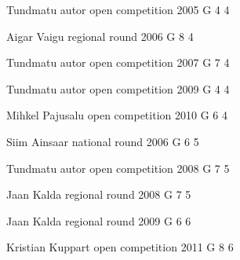 \documentclass[11pt]{article}
\begin{document}
\ylDisplay{} %
{Tundmatu autor} %
{open competition} %
{2005} %
{G 4} %
{4} %
{

\ifEngStatement
\fi
}

\ylDisplay{} %
{Aigar Vaigu} %
{regional round} %
{2006} %
{G 8} %
{4} %
{

\ifEngStatement
\fi
}

\ylDisplay{} %
{Tundmatu autor} %
{open competition} %
{2007} %
{G 7} %
{4} %
{

\ifEngStatement
\fi
}

\ylDisplay{} %
{Tundmatu autor} %
{open competition} %
{2009} %
{G 4} %
{4} %
{

\ifEngStatement
\fi
}

\ylDisplay{} %
{Mihkel Pajusalu} %
{open competition} %
{2010} %
{G 6} %
{4} %
{

\ifEngStatement
\fi
}

\ylDisplay{} %
{Siim Ainsaar} %
{national round} %
{2006} %
{G 6} %
{5} %
{

\ifEngStatement
\fi
}

\ylDisplay{} %
{Tundmatu autor} %
{open competition} %
{2008} %
{G 7} %
{5} %
{

\ifEngStatement
\fi
}

\ylDisplay{} %
{Jaan Kalda} %
{regional round} %
{2008} %
{G 7} %
{5} %
{

\ifEngStatement
\fi
}

\ylDisplay{} %
{Jaan Kalda} %
{regional round} %
{2009} %
{G 6} %
{6} %
{

\ifEngStatement
\fi
}

\ylDisplay{} %
{Kristian Kuppart} %
{open competition} %
{2011} %
{G 8} %
{6} %
{

\ifEngStatement
\fi
}
\end{document}

